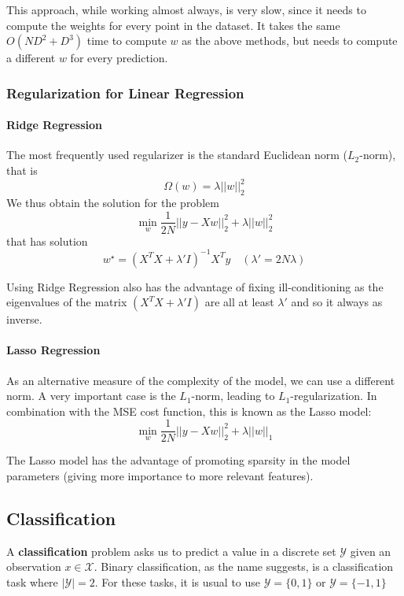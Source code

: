 \documentclass{article}
\begin{document}
This approach, while working almost always, is very slow, since it needs to compute the weights for every point in the dataset.
It takes the same $O(ND^2 + D^3)$ time to compute $w$ as the above methods, but needs to compute a different $w$ for every prediction.

\subsubsection{Regularization for Linear Regression}

\paragraph{Ridge Regression}

The most frequently used regularizer is the standard Euclidean norm ($L_2$-norm), that is
$$
\Omega(w) = \lambda ||w||_2^2
$$
We thus obtain the solution for the problem
$$
\min_w \frac{1}{2N}||y - Xw||_2^2 + \lambda ||w||_2^2
$$
that has solution
$$
w^\star = (X^T X + \lambda' I)^{-1} X^T y \quad (\lambda' = 2N\lambda)
$$

Using Ridge Regression also has the advantage of fixing ill-conditioning as the eigenvalues of the matrix $(X^T X + \lambda' I)$ are all at least $\lambda'$ and so it always as inverse.

\paragraph{Lasso Regression}

As an alternative measure of the complexity of the model, we can use a different norm.
A very important case is the $L_1$-norm, leading to $L_1$-regularization.
In combination with the MSE cost function, this is known as the Lasso model:
$$
\min_w \frac{1}{2N} ||y - X w||_2^2 + \lambda ||w||_1
$$

The Lasso model has the advantage of promoting sparsity in the model parameters (giving more importance to more relevant features).

\subsection{Classification}

A \textbf{classification} problem asks us to predict a value in a discrete set $\mathcal{Y}$ given an observation $x \in \mathcal{X}$.
Binary classification, as the name suggests, is a classification task where $|\mathcal{Y}| = 2$.
For these tasks, it is usual to use $\mathcal{Y} = \{0,1\}$ or $\mathcal{Y} = \{-1,1\}$
\end{document}
